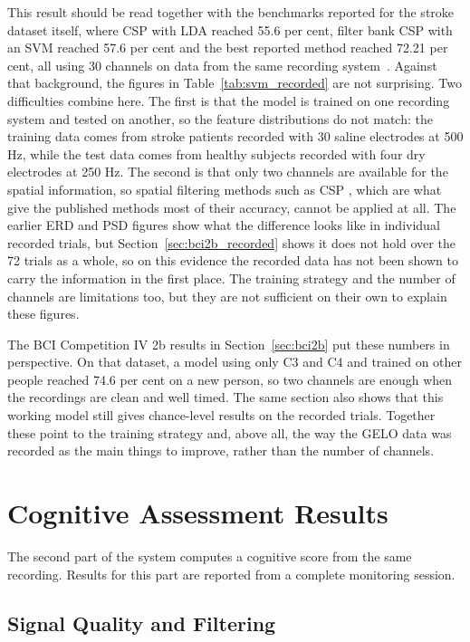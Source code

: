 This result should be read together with the benchmarks reported for the stroke dataset
itself, where CSP with LDA reached 55.6 per cent, filter bank CSP with an SVM reached 57.6
per cent and the best reported method reached 72.21 per cent, all using 30 channels on data
from the same recording system~\cite{liu2024mi}. Against that background, the figures in
Table~\ref{tab:svm_recorded} are not surprising. Two difficulties combine here. The first
is that the model is trained on one recording system and tested on another, so the feature
distributions do not match: the training data comes from stroke patients recorded with 30
saline electrodes at 500 Hz, while the test data comes from healthy subjects recorded with
four dry electrodes at 250 Hz. The second is that only two channels are available for the
spatial information, so spatial filtering methods such as CSP \cite{ramoser2000csp}, which are what give the
published methods most of their accuracy, cannot be applied at all. The earlier ERD and PSD
figures show what the difference looks like in individual recorded trials, but
Section~\ref{sec:bci2b_recorded} shows it does not hold over the 72 trials as a whole, so
on this evidence the recorded data has not been shown to carry the information in the
first place. The training strategy and the number of channels are limitations too, but
they are not sufficient on their own to explain these figures.

The BCI Competition IV 2b results in Section~\ref{sec:bci2b} put these numbers in
perspective. On that dataset, a model using only C3 and C4 and trained on other people
reached 74.6 per cent on a new person, so two channels are enough when the recordings are
clean and well timed. The same section also shows that this working model still gives
chance-level results on the recorded trials. Together these point to the training
strategy and, above all, the way the GELO data was recorded as the main things to
improve, rather than the number of channels.

\FloatBarrier

\section{Cognitive Assessment Results}

The second part of the system computes a cognitive score from the same recording. Results
for this part are reported from a complete monitoring session.

\subsection{Signal Quality and Filtering}

